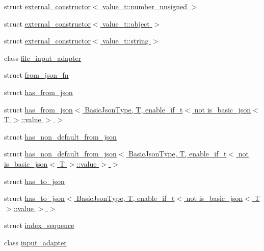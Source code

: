 \begin{DoxyCompactItemize}
\item 
struct \hyperlink{structnlohmann_1_1detail_1_1external__constructor_3_01value__t_1_1number__unsigned_01_4}{external\+\_\+constructor$<$ value\+\_\+t\+::number\+\_\+unsigned $>$}
\item 
struct \hyperlink{structnlohmann_1_1detail_1_1external__constructor_3_01value__t_1_1object_01_4}{external\+\_\+constructor$<$ value\+\_\+t\+::object $>$}
\item 
struct \hyperlink{structnlohmann_1_1detail_1_1external__constructor_3_01value__t_1_1string_01_4}{external\+\_\+constructor$<$ value\+\_\+t\+::string $>$}
\item 
class \hyperlink{classnlohmann_1_1detail_1_1file__input__adapter}{file\+\_\+input\+\_\+adapter}
\item 
struct \hyperlink{structnlohmann_1_1detail_1_1from__json__fn}{from\+\_\+json\+\_\+fn}
\item 
struct \hyperlink{structnlohmann_1_1detail_1_1has__from__json}{has\+\_\+from\+\_\+json}
\item 
struct \hyperlink{structnlohmann_1_1detail_1_1has__from__json_3_01_basic_json_type_00_01_t_00_01enable__if__t_3_01e29213c543deddccc314d19cbaf9f3b4}{has\+\_\+from\+\_\+json$<$ Basic\+Json\+Type, T, enable\+\_\+if\+\_\+t$<$ not is\+\_\+basic\+\_\+json$<$ T $>$\+::value $>$ $>$}
\item 
struct \hyperlink{structnlohmann_1_1detail_1_1has__non__default__from__json}{has\+\_\+non\+\_\+default\+\_\+from\+\_\+json}
\item 
struct \hyperlink{structnlohmann_1_1detail_1_1has__non__default__from__json_3_01_basic_json_type_00_01_t_00_01enab81bd4c814ac1146ff15f3f4636933207}{has\+\_\+non\+\_\+default\+\_\+from\+\_\+json$<$ Basic\+Json\+Type, T, enable\+\_\+if\+\_\+t$<$ not is\+\_\+basic\+\_\+json$<$ T $>$\+::value $>$ $>$}
\item 
struct \hyperlink{structnlohmann_1_1detail_1_1has__to__json}{has\+\_\+to\+\_\+json}
\item 
struct \hyperlink{structnlohmann_1_1detail_1_1has__to__json_3_01_basic_json_type_00_01_t_00_01enable__if__t_3_01nob111e71d40e2273c290d1ce5c6a3b84f}{has\+\_\+to\+\_\+json$<$ Basic\+Json\+Type, T, enable\+\_\+if\+\_\+t$<$ not is\+\_\+basic\+\_\+json$<$ T $>$\+::value $>$ $>$}
\item 
struct \hyperlink{structnlohmann_1_1detail_1_1index__sequence}{index\+\_\+sequence}
\item 
class \hyperlink{classnlohmann_1_1detail_1_1input__adapter}{input\+\_\+adapter}
\item 

\end{DoxyCompactItemize}
